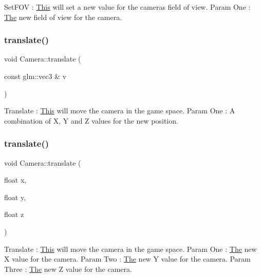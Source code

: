 Set\+F\+OV \+: \mbox{\hyperlink{class_this}{This}} will set a new value for the camera\textquotesingle{}s field of view. Param One \+: \mbox{\hyperlink{class_the}{The}} new field of view for the camera. \mbox{\label{class_camera_aa00429d00bae4984467f9c5d1a3bd158}} 
\subsubsection{\texorpdfstring{translate()}{translate()}\hspace{0.1cm}{\footnotesize\ttfamily [1/2]}}
{\footnotesize\ttfamily void Camera\+::translate (\begin{DoxyParamCaption}\item[{const glm\+::vec3 \&}]{v }\end{DoxyParamCaption})\hspace{0.3cm}{\ttfamily [inline]}}

Translate \+: \mbox{\hyperlink{class_this}{This}} will move the camera in the game space. Param One \+: A combination of X, Y and Z values for the new position. \mbox{\label{class_camera_ac9e53556c53beee69c77a97e2a1c1068}} 
\subsubsection{\texorpdfstring{translate()}{translate()}\hspace{0.1cm}{\footnotesize\ttfamily [2/2]}}
{\footnotesize\ttfamily void Camera\+::translate (\begin{DoxyParamCaption}\item[{float}]{x,  }\item[{float}]{y,  }\item[{float}]{z }\end{DoxyParamCaption})\hspace{0.3cm}{\ttfamily [inline]}}

Translate \+: \mbox{\hyperlink{class_this}{This}} will move the camera in the game space. Param One \+: \mbox{\hyperlink{class_the}{The}} new X value for the camera. Param Two \+: \mbox{\hyperlink{class_the}{The}} new Y value for the camera. Param Three \+: \mbox{\hyperlink{class_the}{The}} new Z value for the camera. \mbox{\label{class_camera_ab4eab94754431725c572d528a07a35cc}} 
